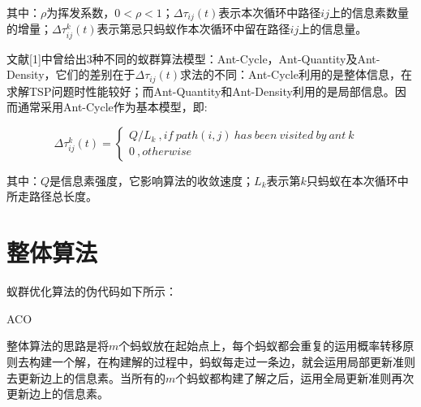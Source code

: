 \documentclass[a4paper,12pt]{report}
\begin{document}
\begin{spacing}{1.5}
	其中：$\rho$为挥发系数，$0< \rho <1$；$\Delta \tau_{ij}(t)$表示本次循环中路径$ij$上的信息素数量的增量；$\Delta \tau_{ij}^k(t)$表示第忌只蚂蚁作本次循环中留在路径$ij$上的信息量。

	文献[1]中曾给出3种不同的蚁群算法模型：Ant-Cycle，Ant-Quantity及Ant-Density，它们的差别在于$\Delta \tau_{ij}(t)$求法的不同：Ant-Cycle利用的是整体信息，在求解TSP问题时性能较好；而Ant-Quantity和Ant-Density利用的是局部信息。因而通常采用Ant-Cycle作为基本模型，即:

	\begin{equation}
		\Delta \tau_{ij}^k(t) = \left\{  
			\begin{array}{lr}  
			   Q/L_k\ ,if \ path(i,j)\ has\ been\ visited\ by\ ant\ k &  \\  
			   0\ , otherwise    
			 \end{array}  
			 \right. 
	\end{equation}

	其中：$Q$是信息素强度，它影响算法的收敛速度；$L_k$表示第$k$只蚂蚁在本次循环中所走路径总长度。



\section{整体算法}
	蚁群优化算法的伪代码如下所示：
	\begin{algorithm}[H]
	\caption{ACO}\label{wolf_alg}
	 \scriptsize
		\begin{algorithmic}
		\end{algorithmic}
	\end{algorithm}

	整体算法的思路是将$m$个蚂蚁放在起始点上，每个蚂蚁都会重复的运用概率转移原则去构建一个解，在构建解的过程中，蚂蚁每走过一条边，就会运用局部更新准则去更新边上的信息素。当所有的$m$个蚂蚁都构建了解之后，运用全局更新准则再次更新边上的信息素。

\end{spacing}
\end{document}
